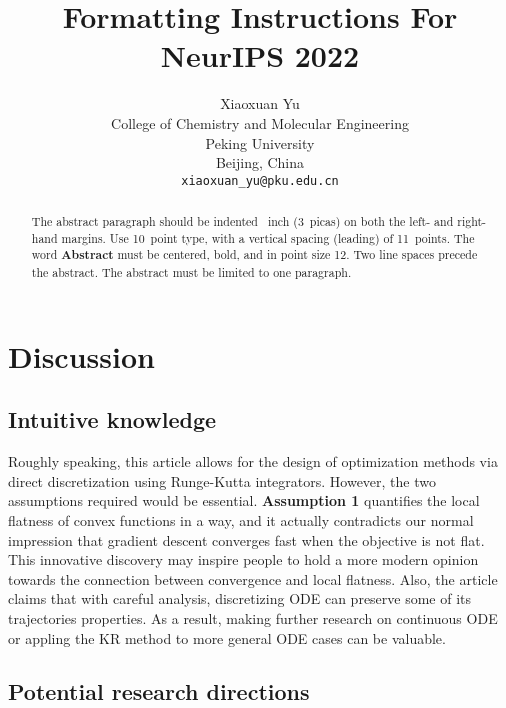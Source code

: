 \documentclass{article}
\title{Formatting Instructions For NeurIPS 2022}
\author{%
  Xiaoxuan Yu \\
  College of Chemistry and Molecular Engineering\\
  Peking University\\
  Beijing, China \\
  \texttt{xiaoxuan\_yu@pku.edu.cn} \\
}
\begin{document}
\maketitle


\begin{abstract}
  The abstract paragraph should be indented ~inch (3~picas) on
  both the left- and right-hand margins. Use 10~point type, with a vertical
  spacing (leading) of 11~points.  The word \textbf{Abstract} must be centered,
  bold, and in point size 12. Two line spaces precede the abstract. The abstract
  must be limited to one paragraph.
\end{abstract}



\section{Discussion}

\subsection{Intuitive knowledge}

Roughly speaking, this article allows for the design of optimization
methods via direct discretization using Runge-Kutta integrators. However, the two
assumptions required would be essential. \textbf{Assumption 1} quantifies the local flatness
of convex functions in a way, and it actually contradicts our normal impression that
gradient descent converges fast when the objective is not flat. This innovative discovery
may inspire people to hold a more modern opinion towards the connection between
convergence and local flatness. Also, the article claims that with careful
analysis, discretizing ODE can preserve some of its trajectories properties.
As a result, making further research on continuous ODE or appling the KR method to
more general ODE cases can be valuable.

\subsection{Potential research directions}
\end{document}
